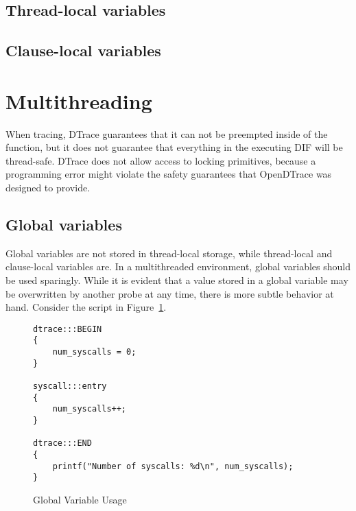 \subsection{Thread-local variables}
\label{subsec:thread-local-variables}

\subsection{Clause-local variables}

\section{Multithreading}


When tracing, DTrace guarantees that it can not be preempted inside of
the  function, but it does not guarantee that
everything in the executing DIF will be thread-safe. DTrace does not
allow access to locking primitives, because a programming error might
violate the safety guarantees that OpenDTrace was designed to provide.

\subsection{Global variables}

Global variables are not stored in thread-local storage, while
thread-local and clause-local variables are. In a multithreaded
environment, global variables should be used sparingly. While it is
evident that a value stored in a global variable may be overwritten by
another probe at any time, there is more subtle behavior at
hand. Consider the script in Figure~\ref{fig:global-var-usage}. \newline

\begin{figure}
  \begin{lstlisting}
dtrace:::BEGIN
{
    num_syscalls = 0;
}

syscall:::entry
{
    num_syscalls++;
}
    
dtrace:::END
{
    printf("Number of syscalls: %d\n", num_syscalls);
}
  \end{lstlisting}
  \caption{Global Variable Usage}
  \label{fig:global-var-usage}
\end{figure}

